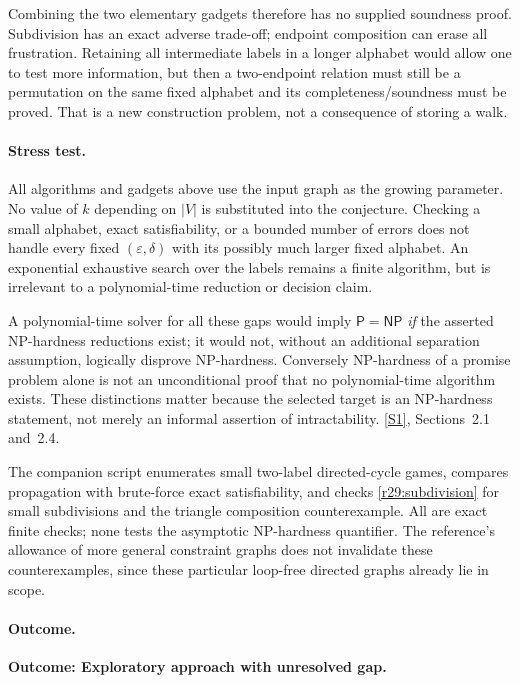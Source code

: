 \documentclass[11pt,a4paper]{article}
\newcommand{\sref}[2]{\hyperlink{source:#1:#2}{[S#2]}}
\numberwithin{equation}{section}
\begin{document}
Combining the two elementary gadgets therefore has no supplied
soundness proof. Subdivision has an exact adverse trade-off; endpoint
composition can erase all frustration. Retaining all intermediate labels
in a longer alphabet would allow one to test more information, but then
a two-endpoint relation must still be a permutation on the same fixed
alphabet and its completeness/soundness must be proved. That is a new
construction problem, not a consequence of storing a walk.

\paragraph{Stress test.}
All algorithms and gadgets above use the input graph as the growing
parameter. No value of $k$ depending on $|V|$ is substituted into the
conjecture. Checking a small alphabet, exact satisfiability, or a bounded
number of errors does not handle every fixed $(\varepsilon,\delta)$
with its possibly much larger fixed alphabet. An exponential exhaustive
search over the labels remains a finite algorithm, but is irrelevant to
a polynomial-time reduction or decision claim.

A polynomial-time solver for all these gaps would imply $\mathsf P=\mathsf{NP}$
\emph{if} the asserted NP-hardness reductions exist; it would not, without
an additional separation assumption, logically disprove NP-hardness.
Conversely NP-hardness of a promise problem alone is not an unconditional
proof that no polynomial-time algorithm exists. These distinctions matter
because the selected target is an NP-hardness statement, not merely an
informal assertion of intractability. \sref{43}{1}, Sections~2.1 and~2.4.

The companion script enumerates small two-label directed-cycle games,
compares propagation with brute-force exact satisfiability, and checks
\eqref{r29:subdivision} for small subdivisions and the triangle
composition counterexample. All are exact finite checks; none tests the
asymptotic NP-hardness quantifier. The reference's allowance of more
general constraint graphs does not invalidate these counterexamples,
since these particular loop-free directed graphs already lie in scope.

\paragraph{Outcome.}
\textbf{Outcome: Exploratory approach with unresolved gap.}
\end{document}
